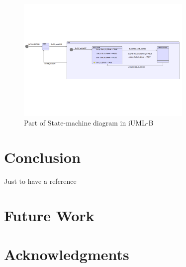 \documentclass{easychair}
\begin{document}
\begin{figure}[]
  \begin{centering}
  \includegraphics[width=0.75\textwidth]{caseStudy/TurnstileSimpleModel_iumlb}
  \caption{Part of State-machine diagram in iUML-B}
  \label{fig:StatemachineiUML-B}
  \end{centering}
\end{figure} 

\section{Conclusion}
\label{sect:concl}

Just to have a reference ~\cite{texniccenter}

\section{Future Work}
\label{sect:future-work}



\section{Acknowledgments}
\label{sect:acks}


\label{sect:bib}

%
%
%




\end{document}
